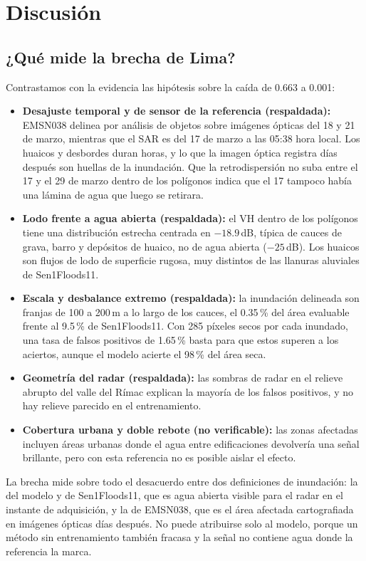 \documentclass[10pt]{article}
\begin{document}
\section{Discusión}
\label{sec:disc}
\subsection{¿Qué mide la brecha de Lima?}
Contrastamos con la evidencia las hipótesis sobre la caída de 0.663 a 0.001:
\begin{itemize}
\item \textbf{Desajuste temporal y de sensor de la referencia (respaldada):} EMSN038 delinea por análisis de objetos sobre imágenes ópticas del 18 y 21 de marzo, mientras que el SAR es del 17 de marzo a las 05:38 hora local. Los huaicos y desbordes duran horas, y lo que la imagen óptica registra días después son huellas de la inundación. Que la retrodispersión no suba entre el 17 y el 29 de marzo dentro de los polígonos indica que el 17 tampoco había una lámina de agua que luego se retirara.
\item \textbf{Lodo frente a agua abierta (respaldada):} el VH dentro de los polígonos tiene una distribución estrecha centrada en $-18.9$\,dB, típica de cauces de grava, barro y depósitos de huaico, no de agua abierta ($-25$\,dB). Los huaicos son flujos de lodo de superficie rugosa, muy distintos de las llanuras aluviales de Sen1Floods11.
\item \textbf{Escala y desbalance extremo (respaldada):} la inundación delineada son franjas de 100 a 200\,m a lo largo de los cauces, el 0.35\,\% del área evaluable frente al 9.5\,\% de Sen1Floods11. Con 285 píxeles secos por cada inundado, una tasa de falsos positivos de 1.65\,\% basta para que estos superen a los aciertos, aunque el modelo acierte el 98\,\% del área seca.
\item \textbf{Geometría del radar (respaldada):} las sombras de radar en el relieve abrupto del valle del Rímac explican la mayoría de los falsos positivos, y no hay relieve parecido en el entrenamiento.
\item \textbf{Cobertura urbana y doble rebote (no verificable):} las zonas afectadas incluyen áreas urbanas donde el agua entre edificaciones devolvería una señal brillante, pero con esta referencia no es posible aislar el efecto.
\end{itemize}
La brecha mide sobre todo el desacuerdo entre dos definiciones de inundación: la del modelo y de Sen1Floods11, que es agua abierta visible para el radar en el instante de adquisición, y la de EMSN038, que es el área afectada cartografiada en imágenes ópticas días después. No puede atribuirse solo al modelo, porque un método sin entrenamiento también fracasa y la señal no contiene agua donde la referencia la marca.
\end{document}
